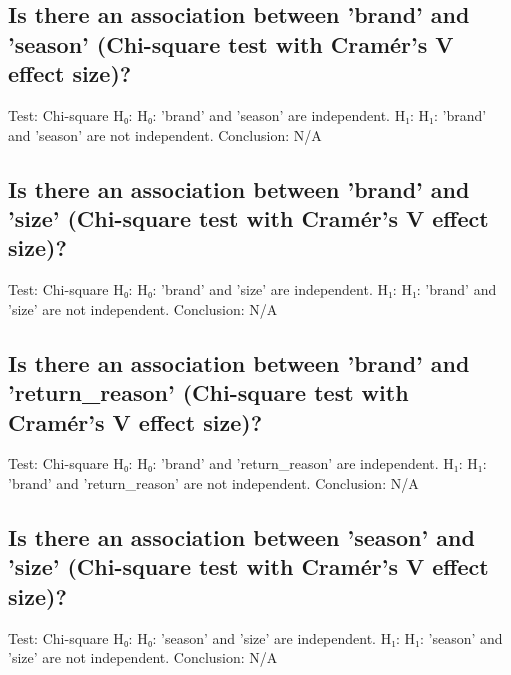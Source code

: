 \documentclass{article}%
\begin{document}
%
\subsection{Is there an association between 'brand' and 'season' (Chi{-}square test with Cramér’s V effect size)?}%
\label{subsec:Isthereanassociationbetweenbrandandseason(Chi{-}squaretestwithCramrsVeffectsize)?}%
Test: Chi{-}square\newline%
H₀: H₀: 'brand' and 'season' are independent.\newline%
H₁: H₁: 'brand' and 'season' are not independent.\newline%
Conclusion: N/A

%
\subsection{Is there an association between 'brand' and 'size' (Chi{-}square test with Cramér’s V effect size)?}%
\label{subsec:Isthereanassociationbetweenbrandandsize(Chi{-}squaretestwithCramrsVeffectsize)?}%
Test: Chi{-}square\newline%
H₀: H₀: 'brand' and 'size' are independent.\newline%
H₁: H₁: 'brand' and 'size' are not independent.\newline%
Conclusion: N/A

%
\subsection{Is there an association between 'brand' and 'return\_reason' (Chi{-}square test with Cramér’s V effect size)?}%
\label{subsec:Isthereanassociationbetweenbrandandreturnreason(Chi{-}squaretestwithCramrsVeffectsize)?}%
Test: Chi{-}square\newline%
H₀: H₀: 'brand' and 'return\_reason' are independent.\newline%
H₁: H₁: 'brand' and 'return\_reason' are not independent.\newline%
Conclusion: N/A

%
\subsection{Is there an association between 'season' and 'size' (Chi{-}square test with Cramér’s V effect size)?}%
\label{subsec:Isthereanassociationbetweenseasonandsize(Chi{-}squaretestwithCramrsVeffectsize)?}%
Test: Chi{-}square\newline%
H₀: H₀: 'season' and 'size' are independent.\newline%
H₁: H₁: 'season' and 'size' are not independent.\newline%
Conclusion: N/A
\end{document}
